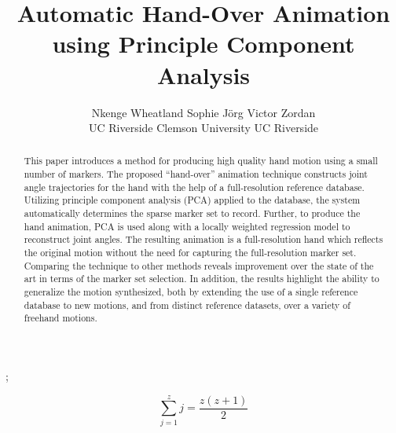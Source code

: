 \documentclass[review]{acmsiggraph}
\title{Automatic Hand-Over Animation using Principle Component Analysis}
\author{Nkenge Wheatland \hspace{10 mm}  
Sophie J\"{o}rg
\hspace{10 mm} 
Victor Zordan 
\\UC Riverside
\hspace{16 mm} Clemson University
\hspace{16 mm} UC Riverside}
\begin{document}

\maketitle

\begin{abstract}
This paper introduces a method for producing high quality hand motion using a
small number of markers. The proposed ``hand-over'' animation technique constructs
joint angle trajectories for the hand with the help of a full-resolution reference database. 
Utilizing principle component analysis (PCA) applied to the database, the system automatically
determines the sparse marker set to record. Further, to produce the hand animation,
PCA is used along with a locally weighted regression model to reconstruct joint angles.   
The resulting animation is a full-resolution hand which reflects the original motion without
the need for capturing the full-resolution marker set.  
Comparing the technique to other
methods reveals improvement over the state of the art in terms of the marker set selection.
In addition, the results highlight the ability to generalize the motion synthesized, both
by extending the use of a single reference database to new motions, and from distinct 
reference datasets, over a variety of freehand motions.



\end{abstract}

\begin{CRcatlist}
  ;
\end{CRcatlist}

\keywordlist

\TOGlinkslist

\copyrightspace












\iffalse
\begin{equation}
 \sum_{j=1}^{z} j = \frac{z(z+1)}{2}
\end{equation}
\end{document}
